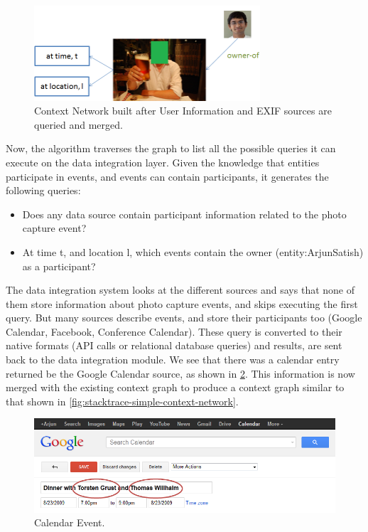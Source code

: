 \begin{figure}[h]
\centering
\includegraphics[width=0.75\textwidth]{media/chapter4/stacktrace/init-network.png}
\caption{Context Network built after User Information and EXIF sources are queried and merged.}
\label{fig:exif-network}
\end{figure}

Now, the algorithm traverses the graph to list all the possible queries it can execute on the data integration layer. Given the knowledge that entities participate in events, and events can contain participants, it generates the following queries:

\begin{itemize}
\item Does any data source contain participant information related to the photo capture event?
\item At time t, and location l, which events contain the owner (entity:ArjunSatish) as a participant?
\end{itemize}

The data integration system looks at the different sources and says that none of them store information about photo capture events, and skips executing the first query. But many sources describe events, and store their participants too (Google Calendar, Facebook, Conference Calendar). These query is converted to their native formats (API calls or relational database queries) and results, are sent back to the data integration module. We see that there was a calendar entry returned be the Google Calendar source, as shown in \ref{fig:stacktrace-simple-calendar}. This information is now merged with the existing context graph to produce a context graph similar to that shown in \ref{fig:stacktrace-simple-context-network}.

\begin{figure}[h]
\centering
\includegraphics[width=\textwidth]{media/chapter4/stacktrace/calendar.png}
\caption{Calendar Event.}
\label{fig:stacktrace-simple-calendar}
\end{figure}

